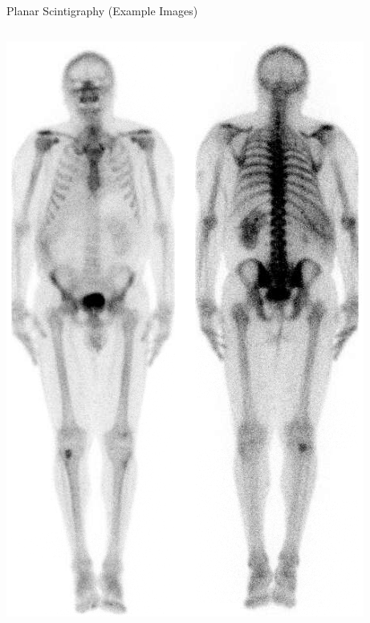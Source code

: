 \begin{frame}{Planar Scintigraphy (Example Images)}

    \begin{columns}[T, onlytextwidth]
        \begin{column}{0.3\textwidth}
            \begin{center}\includegraphics[height=0.6\textheight]{images/wholebody_patient_data}\\


\end{center}
\end{column}
\end{columns}
\end{frame}
